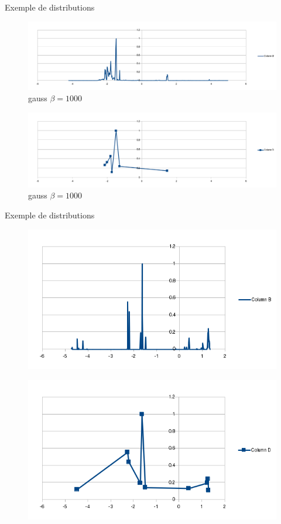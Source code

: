 \documentclass[11pt]{beamer}
\begin{document}
\begin{frame}{Exemple de distributions}

\begin{figure}[hbtp]
\centering
\includegraphics[width=\columnwidth]{distribution_along_normal.png}
\caption{gauss $\beta=1000$}
\end{figure}
\begin{figure}[hbtp]
\centering
\includegraphics[width=\columnwidth]{distribution_along_normal_max.png}
\caption{gauss $\beta=1000$}
\end{figure}

\end{frame}


\begin{frame}{Exemple de distributions}

\begin{figure}[hbtp]
\centering
\includegraphics[width=.5\textwidth]{distribution_along_normal1.png}
\end{figure}
\begin{figure}[hbtp]
\centering
\includegraphics[width=.5\textwidth]{distribution_along_normal_max1.png}
\end{figure}

\end{frame}
\end{document}
